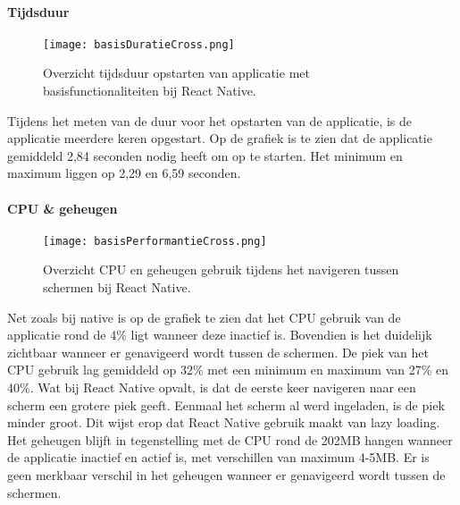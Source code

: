\paragraph{Tijdsduur}
\begin{figure}[H]
    \centering
    \texttt{[image: basisDuratieCross.png]}
    \caption{Overzicht tijdsduur opstarten van applicatie met basisfunctionaliteiten bij React Native.}
\end{figure}
Tijdens het meten van de duur voor het opstarten van de applicatie, 
is de applicatie meerdere keren opgestart. Op de grafiek is te zien dat de applicatie
gemiddeld 2,84 seconden nodig heeft om op te starten. Het minimum en maximum
liggen op 2,29 en 6,59 seconden.

\paragraph{CPU \& geheugen}
\begin{figure}[H]
    \centering
    \texttt{[image: basisPerformantieCross.png]}
    \caption{Overzicht CPU en geheugen gebruik tijdens het navigeren tussen schermen bij React Native.}
\end{figure}
Net zoals bij native is op de grafiek te zien dat het CPU gebruik van de applicatie 
rond de 4\% ligt wanneer deze inactief is. Bovendien is het duidelijk zichtbaar wanneer er
genavigeerd wordt tussen de schermen. De piek van het CPU gebruik lag gemiddeld
op 32\% met een minimum en maximum van 27\% en 40\%. Wat bij React Native opvalt, is dat
de eerste keer navigeren naar een scherm een grotere piek geeft. Eenmaal het scherm 
al werd ingeladen, is de piek minder groot. Dit wijst erop dat React Native gebruik maakt van
lazy loading. Het geheugen blijft in tegenstelling
met de CPU rond de 202MB hangen wanneer de applicatie inactief en actief is, met
verschillen van maximum 4-5MB. Er is geen merkbaar verschil in het geheugen wanneer
er genavigeerd wordt tussen de schermen.

